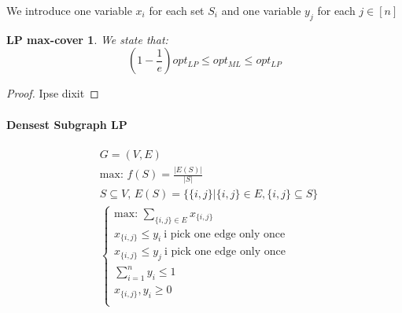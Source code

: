 \documentclass[]{article}
\begin{document}
We introduce one variable $x_i$ for each set $S_i$ and one variable $y_j$ for each $j \in [n]$

\newtheorem{linearmaxcover}{LP max-cover}

\begin{linearmaxcover}
	We state that:
	\[
	\left(1-\frac{1}{e}\right) opt_{LP} \leq opt_{ML} \leq opt_{LP}
	\]
\end{linearmaxcover}

\begin{proof}
	Ipse dixit
\end{proof}

\paragraph{Densest Subgraph LP}
\begin{align*}
	&G=(V,E)\\
	&\text{max: } f(S) = \frac{|E(S)|}{|S|}\\
	&S\subseteq V,\, E(S) = \{ \{i, j\} | \{i, j\} \in E, \{i, j\} \subseteq S \}\\
	&\begin{cases}
	\text{max: } \sum_{\{i, j\} \in E}^{} x_{\{i, j\}}\\
	x_{\{i, j\}} \leq y_i\ \text{i pick one edge only once}\\
	x_{\{i, j\}} \leq y_j\ \text{i pick one edge only once}\\
	\sum_{i = 1}^{n} y_i \leq 1\\
	x_{\{i, j\}}, y_i \geq 0\\
	\end{cases}
\end{align*}
\end{document}

